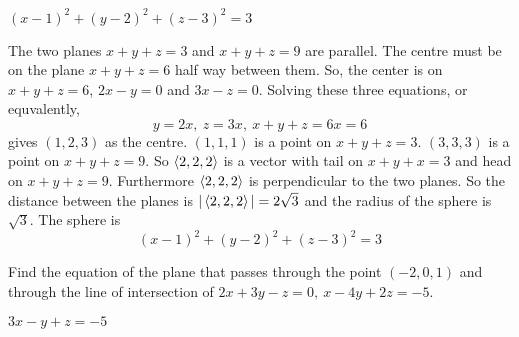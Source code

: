 
\begin{answer}
$(x-1)^2+(y-2)^2+(z-3)^2=3$
\end{answer}

\begin{solution}
The two planes $x+y+z=3$ and $x+y+z=9$ are parallel.
The centre must be on the plane $x+y+z=6$ half way between them.
So, the center is on $x+y+z=6$, $2x-y=0$ and $3x-z=0$. Solving these
three equations, or equvalently,
\begin{equation*}
y=2x,\ z=3x,\ x+y+z=6x=6
\end{equation*}
gives $(1,2,3)$ as the centre. $(1,1,1)$ is a point on
$x+y+z=3$. $(3,3,3)$ is a point on $x+y+z=9$. So $\left< 2,2,2\right>$ is a vector
with tail on $x+y+x=3$ and head on $x+y+z=9$. Furthermore $\left< 2,2,2\right>$
is perpendicular to the two planes. So the distance between the planes
is $|\left< 2,2,2\right>|=2\sqrt{3}$ and the radius of the sphere is $\sqrt{3}$. 
The sphere is
\begin{equation*}
(x-1)^2+(y-2)^2+(z-3)^2=3
\end{equation*}
\end{solution}


\begin{question}
Find the equation of the plane that passes through the point
$(-2,0,1)$ and through the line of intersection of $2x+3y-z=0,\ x-4y+2z=-5$.
\end{question}


\begin{answer}
$3x-y+z=-5$
\end{answer}

